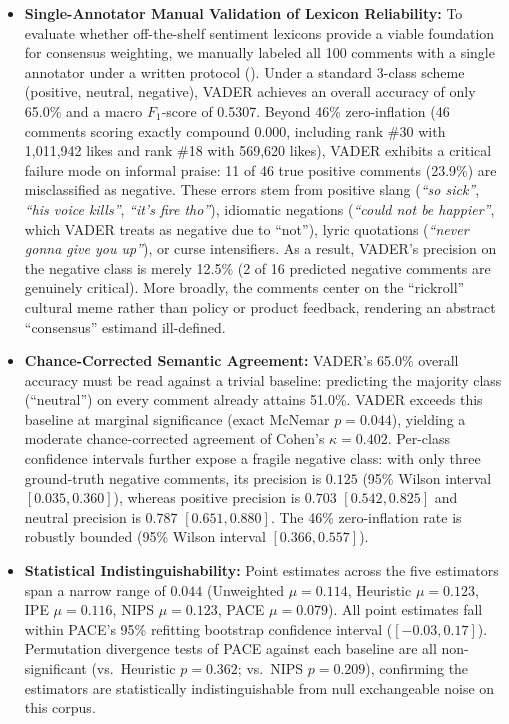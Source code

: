 \documentclass[journal]{IEEEtran}
\begin{document}
\begin{itemize}
    \item \textbf{Single-Annotator Manual Validation of Lexicon Reliability:} To evaluate whether off-the-shelf sentiment lexicons provide a viable foundation for consensus weighting, we manually labeled all 100 comments with a single annotator under a written protocol (). Under a standard 3-class scheme (positive, neutral, negative), VADER achieves an overall accuracy of only 65.0\% and a macro $F_1$-score of 0.5307. Beyond 46\% zero-inflation (46 comments scoring exactly compound 0.000, including rank \#30 with 1,011,942 likes and rank \#18 with 569,620 likes), VADER exhibits a critical failure mode on informal praise: 11 of 46 true positive comments (23.9\%) are misclassified as negative. These errors stem from positive slang (\emph{``so sick''}, \emph{``his voice kills''}, \emph{``it's fire tho''}), idiomatic negations (\emph{``could not be happier''}, which VADER treats as negative due to ``not''), lyric quotations (\emph{``never gonna give you up''}), or curse intensifiers. As a result, VADER's precision on the negative class is merely 12.5\% (2 of 16 predicted negative comments are genuinely critical). More broadly, the comments center on the ``rickroll'' cultural meme rather than policy or product feedback, rendering an abstract ``consensus'' estimand ill-defined.
    \item \textbf{Chance-Corrected Semantic Agreement:} VADER's 65.0\% overall accuracy must be read against a trivial baseline: predicting the majority class (``neutral'') on every comment already attains 51.0\%. VADER exceeds this baseline at marginal significance (exact McNemar $p = 0.044$), yielding a moderate chance-corrected agreement of Cohen's $\kappa = 0.402$. Per-class confidence intervals further expose a fragile negative class: with only three ground-truth negative comments, its precision is $0.125$ (95\% Wilson interval $[0.035, 0.360]$), whereas positive precision is $0.703$ $[0.542, 0.825]$ and neutral precision is $0.787$ $[0.651, 0.880]$. The 46\% zero-inflation rate is robustly bounded (95\% Wilson interval $[0.366, 0.557]$).
    \item \textbf{Statistical Indistinguishability:} Point estimates across the five estimators span a narrow range of $0.044$ (Unweighted $\mu = 0.114$, Heuristic $\mu = 0.123$, IPE $\mu = 0.116$, NIPS $\mu = 0.123$, PACE $\mu = 0.079$). All point estimates fall within PACE's 95\% refitting bootstrap confidence interval ($[-0.03, 0.17]$). Permutation divergence tests of PACE against each baseline are all non-significant (vs.\ Heuristic $p = 0.362$; vs.\ NIPS $p = 0.209$), confirming the estimators are statistically indistinguishable from null exchangeable noise on this corpus.

\end{itemize}
\end{document}
